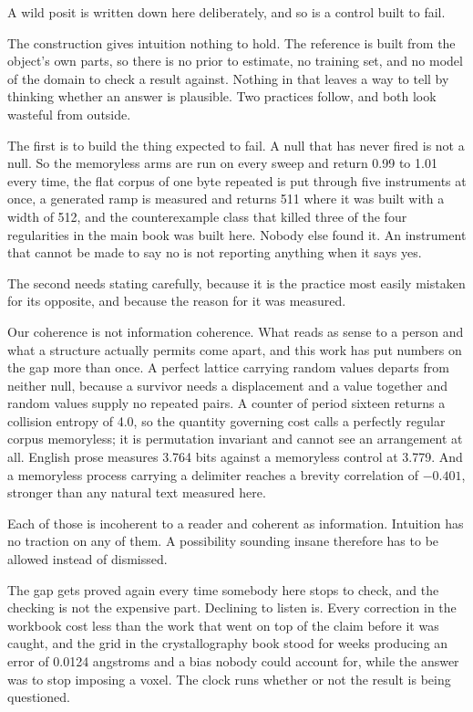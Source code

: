 A wild posit is written down here deliberately, and so is a control built to fail.

The construction gives intuition nothing to hold. The reference is built from the object's own parts,
so there is no prior to estimate, no training set, and no model of the domain to check a result
against. Nothing in that leaves a way to tell by thinking whether an answer is plausible. Two
practices follow, and both look wasteful from outside.

The first is to build the thing expected to fail. A null that has never fired is not a null. So the
memoryless arms are run on every sweep and return 0.99 to 1.01 every time, the flat corpus of one
byte repeated is put through five instruments at once, a generated ramp is measured and returns 511
where it was built with a width of 512, and the counterexample class that killed three of the four
regularities in the main book was built here. Nobody else found it. An instrument that
cannot be made to say no is not reporting anything when it says yes.

The second needs stating carefully, because it is the practice most easily mistaken for its opposite,
and because the reason for it was measured.

Our coherence is not information coherence. What reads as sense to a person and what a structure
actually permits come apart, and this work has put numbers on the gap more than once. A perfect
lattice carrying random values departs from neither null, because a survivor needs a displacement and
a value together and random values supply no repeated pairs. A counter of period sixteen returns a
collision entropy of 4.0, so the quantity governing cost calls a perfectly regular corpus memoryless;
it is permutation invariant and cannot see an arrangement at all. English prose measures 3.764 bits
against a memoryless control at 3.779. And a memoryless process carrying a delimiter reaches a
brevity correlation of $-0.401$, stronger than any natural text measured here.

Each of those is incoherent to a reader and coherent as information. Intuition has no traction on any
of them. A possibility sounding insane therefore has to be allowed instead of dismissed.

The gap gets proved again every time somebody here stops to check, and the checking is not the
expensive part. Declining to listen is. Every correction in the workbook cost less than the work that
went on top of the claim before it was caught, and the grid in the crystallography book stood for
weeks producing an error of 0.0124 angstroms and a bias nobody could account for, while the answer
was to stop imposing a voxel. The clock runs whether or not the result is being questioned.

